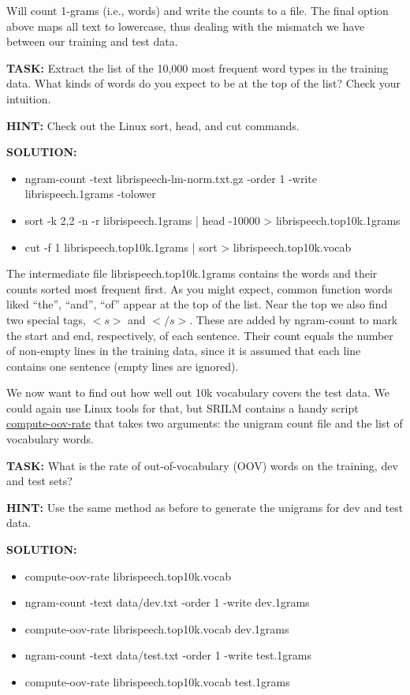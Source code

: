 Will count 1-grams (i.e., words) and write the counts to a file. The final option above maps all text to lowercase, thus dealing with the mismatch we have between our training and test data.

{\bf TASK:} Extract the list of the 10,000 most frequent word types in the training data. What kinds of words do you expect to be at the top of the list? Check your intuition.

{\bf HINT:} Check out the Linux sort, head, and cut commands.

{\bf SOLUTION:}
\begin{itemize}
	\item ngram-count -text librispeech-lm-norm.txt.gz -order 1 -write librispeech.1grams -tolower
	\item sort -k 2,2 -n -r librispeech.1grams | head -10000 > librispeech.top10k.1grams
	\item cut -f 1 librispeech.top10k.1grams | sort > librispeech.top10k.vocab
\end{itemize}

The intermediate file librispeech.top10k.1grams contains the words and their counts sorted most frequent first. As you might expect, common function words liked “the”, “and”, “of” appear at the top of the list. Near the top we also find two special tags, $<s>$ and $</s>$. These are added by ngram-count to mark the start and end, respectively, of each sentence. Their count equals the number of non-empty lines in the training data, since it is assumed that each line contains one sentence (empty lines are ignored).

We now want to find out how well out 10k vocabulary covers the test data. We could again use Linux tools for that, but SRILM contains a handy script \href{http://www.speech.sri.com/projects/srilm/manpages/training-scripts.1.html}{compute-oov-rate} that takes two arguments: the unigram count file and the list of vocabulary words.

{\bf TASK:} What is the rate of out-of-vocabulary (OOV) words on the training, dev and test sets?

{\bf HINT:}  Use the same method as before to generate the unigrams for dev and test data.

{\bf SOLUTION:}
\begin{itemize}
	\item compute-oov-rate librispeech.top10k.vocab
	\item ngram-count -text data/dev.txt -order 1 -write dev.1grams
	\item compute-oov-rate librispeech.top10k.vocab dev.1grams
	\item ngram-count -text data/test.txt -order 1 -write test.1grams
	\item compute-oov-rate librispeech.top10k.vocab test.1grams
\end{itemize}

